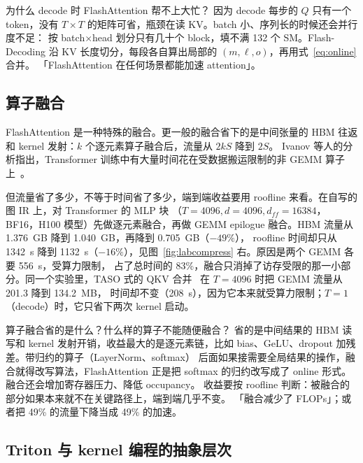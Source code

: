 \begin{qa}{为什么 decode 时 FlashAttention 帮不上大忙？}
\ans 因为 decode 每步的 $Q$ 只有一个 token，没有 $T\times T$ 的矩阵可省，瓶颈在读 KV。batch 小、序列长的时候还会并行度不足：
按 batch$\times$head 划分只有几十个 block，填不满 132 个 SM。Flash-Decoding 沿 KV 长度切分，每段各自算出局部的 $(m,\ell,o)$，再用式~\eqref{eq:online} 合并。
\wrong 「FlashAttention 在任何场景都能加速 attention」。
\end{qa}

\subsection{算子融合}

FlashAttention 是一种特殊的融合。更一般的融合省下的是中间张量的 HBM 往返和 kernel 发射：$k$ 个逐元素算子融合后，流量从 $2kS$ 降到 $2S$。
Ivanov 等人的分析指出，Transformer 训练中有大量时间花在受数据搬运限制的非 GEMM 算子上~\cite{ivanov2021data}。

但流量省了多少，不等于时间省了多少，端到端收益要用 roofline 来看。在自写的图 IR 上，对 Transformer 的 MLP 块
（$T=4096,d=4096,d_{ff}=16384$，BF16，H100 模型）先做逐元素融合，再做 GEMM epilogue 融合。HBM 流量从 1.376~GB 降到 1.040~GB，再降到 0.705~GB（$-49\%$），
roofline 时间却只从 1342~\textmu s 降到 1132~\textmu s（$-16\%$），见图~\ref{fig:labcompress} 右。原因是两个 GEMM 各要 556~\textmu s，受算力限制，
占了总时间的 83\%，融合只消掉了访存受限的那一小部分。同一个实验里，TASO 式的 QKV 合并~\cite{jia2019taso} 在 $T=4096$ 时把 GEMM 流量从 201.3 降到 134.2~MB，
时间却不变（208~\textmu s），因为它本来就受算力限制；$T=1$（decode）时，它只省下两次 kernel 启动。

\begin{qa}{算子融合省的是什么？什么样的算子不能随便融合？}
\ans 省的是中间结果的 HBM 读写和 kernel 发射开销，收益最大的是逐元素链，比如 bias、GeLU、dropout 加残差。带归约的算子（LayerNorm、softmax）
后面如果接需要全局结果的操作，融合就得改写算法，FlashAttention 正是把 softmax 的归约改写成了 online 形式。融合还会增加寄存器压力、降低 occupancy。
收益要按 roofline 判断：被融合的部分如果本来就不在关键路径上，端到端几乎不变。
\wrong 「融合减少了 FLOPs」；或者把 49\% 的流量下降当成 49\% 的加速。
\end{qa}

\subsection{Triton 与 kernel 编程的抽象层次}

